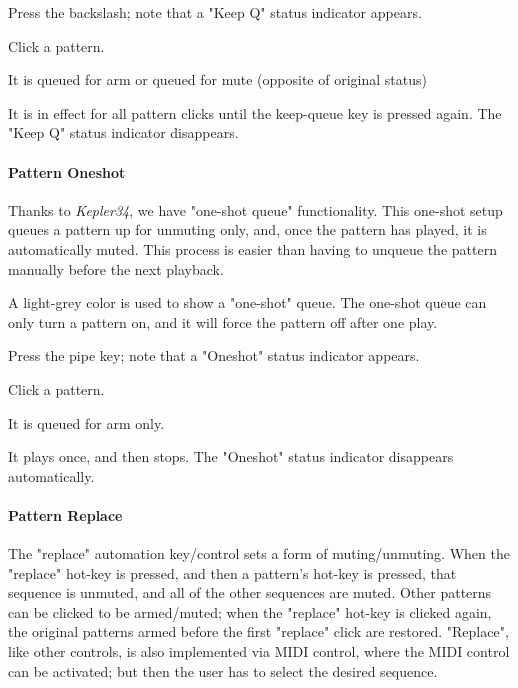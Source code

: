    \begin{enumber}
      \item Press the backslash; note that a "Keep Q" status indicator appears.
      \item Click a pattern.
      \item It is queued for arm or queued for mute (opposite of original status)
      \item It is in effect for all pattern clicks until the keep-queue key
         is pressed again.
         The "Keep Q" status indicator disappears.
   \end{enumber}

\paragraph{Pattern Oneshot}
\label{paragraph:patterns_pattern_oneshot}

   Thanks to \textsl{Kepler34}, we have "one-shot queue"
   functionality.  This one-shot setup queues a pattern up for unmuting only,
   and, once the pattern has played, it is automatically muted.  This process
   is easier than having to unqueue the pattern manually before the next
   playback.

   A light-grey color is used to show a "one-shot" queue.
   The one-shot queue can only turn a pattern on, and it
   will force the pattern off after one play.

   \begin{enumber}
      \item Press the pipe key; note that a "Oneshot" status indicator appears.
      \item Click a pattern.
      \item It is queued for arm only.
      \item It plays once, and then stops.
         The "Oneshot" status indicator disappears automatically.
   \end{enumber}

\paragraph{Pattern Replace}
\label{paragraph:patterns_pattern_replace}

   The "replace" automation key/control sets a form of muting/unmuting.
   When the "replace" hot-key is
   pressed, and then a pattern's hot-key is pressed,
   that sequence is unmuted, and all of the other sequences are muted.
   Other patterns can be clicked to be armed/muted; when the "replace" hot-key
   is clicked again, the original patterns armed before the first "replace"
   click are restored.
   "Replace", like other controls, is also implemented via MIDI control,
   where the MIDI control can be activated; but then the user has to select
   the desired sequence.  

